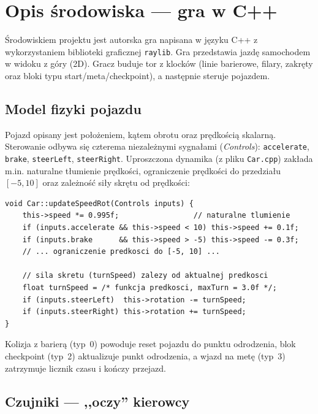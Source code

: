 \documentclass[11pt,a4paper]{article}
\begin{document}
\section{Opis środowiska --- gra w C++}
\label{sec:srodowisko}

Środowiskiem projektu jest autorska gra napisana w języku C++ z wykorzystaniem
biblioteki graficznej \texttt{raylib}. Gra przedstawia jazdę samochodem w widoku
z góry (2D). Gracz buduje tor z klocków (linie barierowe, filary, zakręty oraz
bloki typu start/meta/checkpoint), a następnie steruje pojazdem.

\subsection{Model fizyki pojazdu}

Pojazd opisany jest położeniem, kątem obrotu oraz prędkością skalarną. Sterowanie
odbywa się czterema niezależnymi sygnałami (\emph{Controls}): \texttt{accelerate},
\texttt{brake}, \texttt{steerLeft}, \texttt{steerRight}. Uproszczona dynamika
(z pliku \texttt{Car.cpp}) zakłada m.in. naturalne tłumienie prędkości, ograniczenie
prędkości do przedziału $[-5, 10]$ oraz zależność siły skrętu od prędkości:

\noindent\begin{minipage}{\linewidth}
\begin{lstlisting}[style=cpp,caption={Aktualizacja prędkości i obrotu pojazdu (fragment \texttt{Car.cpp}).}]
void Car::updateSpeedRot(Controls inputs) {
    this->speed *= 0.995f;                 // naturalne tlumienie
    if (inputs.accelerate && this->speed < 10) this->speed += 0.1f;
    if (inputs.brake      && this->speed > -5) this->speed -= 0.3f;
    // ... ograniczenie predkosci do [-5, 10] ...

    // sila skretu (turnSpeed) zalezy od aktualnej predkosci
    float turnSpeed = /* funkcja predkosci, maxTurn = 3.0f */;
    if (inputs.steerLeft)  this->rotation -= turnSpeed;
    if (inputs.steerRight) this->rotation += turnSpeed;
}
\end{lstlisting}
\end{minipage}

Kolizja z barierą (typ~0) powoduje reset pojazdu do punktu odrodzenia, blok
checkpoint (typ~2) aktualizuje punkt odrodzenia, a wjazd na metę (typ~3) zatrzymuje
licznik czasu i kończy przejazd.

\subsection{Czujniki --- ,,oczy'' kierowcy}
\label{sec:czujniki}
\end{document}
